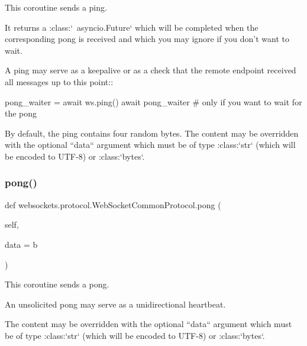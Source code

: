 \begin{DoxyVerb}This coroutine sends a ping.

It returns a :class:`~asyncio.Future` which will be completed when the
corresponding pong is received and which you may ignore if you don't
want to wait.

A ping may serve as a keepalive or as a check that the remote endpoint
received all messages up to this point::

    pong_waiter = await ws.ping()
    await pong_waiter   # only if you want to wait for the pong

By default, the ping contains four random bytes. The content may be
overridden with the optional ``data`` argument which must be of type
:class:`str` (which will be encoded to UTF-8) or :class:`bytes`.\end{DoxyVerb}
 \mbox{\label{classwebsockets_1_1protocol_1_1_web_socket_common_protocol_aaac0bd94a1cf0015cb0aa687daf78676}} 
\subsubsection{\texorpdfstring{pong()}{pong()}}
{\footnotesize\ttfamily def websockets.\+protocol.\+Web\+Socket\+Common\+Protocol.\+pong (\begin{DoxyParamCaption}\item[{}]{self,  }\item[{}]{data = {\ttfamily b\textquotesingle{}\textquotesingle{}} }\end{DoxyParamCaption})}

\begin{DoxyVerb}This coroutine sends a pong.

An unsolicited pong may serve as a unidirectional heartbeat.

The content may be overridden with the optional ``data`` argument
which must be of type :class:`str` (which will be encoded to UTF-8) or
:class:`bytes`.\end{DoxyVerb}
 \mbox{\label{classwebsockets_1_1protocol_1_1_web_socket_common_protocol_a0736093eb665ea46a97730d255173cb9}} 

